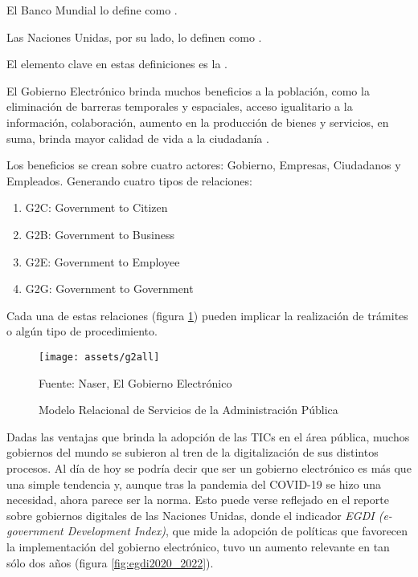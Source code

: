 El Banco Mundial lo define como
.

Las Naciones Unidas, por su lado, lo definen como
.

El elemento clave en estas definiciones es la \cite{naserGobiernoElectronicoGestion2011}.


El Gobierno Electrónico brinda muchos beneficios a la población, como
la eliminación de barreras temporales y espaciales,
acceso igualitario a la información, colaboración, aumento en la producción de bienes y servicios,
en suma, brinda mayor calidad de vida a la ciudadanía \cite[16]{naserGobiernoElectronicoGestion2011}.

Los beneficios se crean sobre cuatro actores: Gobierno, Empresas, Ciudadanos y Empleados. Generando cuatro tipos de relaciones:

\begin{enumerate}
    \item G2C: Government to Citizen
    \item G2B: Government to Business
    \item G2E: Government to Employee
    \item G2G: Government to Government
\end{enumerate}

Cada una de estas relaciones (figura \ref{fig:g2all}) pueden implicar la realización de trámites o algún tipo de procedimiento.

\begin{figure}[!htpb]
    \centering
    \texttt{[image: assets/g2all]}
    \caption{Modelo Relacional de Servicios de la Administración Pública}{Fuente: Naser, El Gobierno Electrónico}
    \label{fig:g2all}
\end{figure}

Dadas las ventajas que brinda la adopción de las TICs en el área pública, muchos gobiernos del mundo se subieron al tren de la digitalización de sus distintos procesos.
Al día de hoy se podría decir que ser un gobierno electrónico es más que una simple tendencia y, aunque tras la pandemia del COVID-19 se hizo una necesidad, ahora parece ser la norma.
Esto puede verse reflejado en el reporte sobre gobiernos digitales de las Naciones Unidas,
donde el indicador \textit{EGDI (e-government Development Index)}, que mide la adopción de políticas que favorecen la implementación del gobierno electrónico,
tuvo un aumento relevante en tan sólo dos años (figura \ref{fig:egdi2020_2022}).

